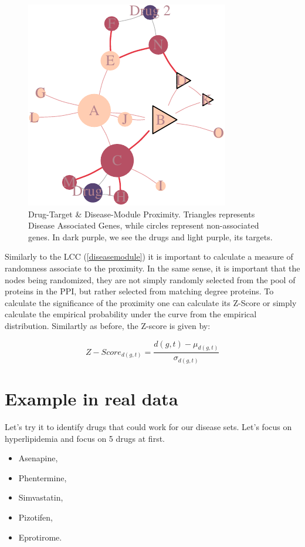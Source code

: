 \documentclass[
]{book}
\providecommand{\tightlist}{%
  \setlength{\itemsep}{0pt}\setlength{\parskip}{0pt}}
\begin{document}
\begin{figure}
\centering
\includegraphics{NetMed_files/figure-latex/proximity-1.pdf}
\caption{\label{fig:proximity}Drug-Target \& Disease-Module Proximity. Triangles represents Disease Associated Genes, while circles represent non-associated genes. In dark purple, we see the drugs and light purple, its targets.}
\end{figure}

Similarly to the LCC (\ref{diseasemodule}) it is important to calculate a measure of randomness associate to the proximity. In the same sense, it is important that the nodes being randomized, they are not simply randomly selected from the pool of proteins in the PPI, but rather selected from matching degree proteins. To calculate the significance of the proximity one can calculate its Z-Score or simply calculate the empirical probability under the curve from the empirical distribution. Similartly as before, the Z-score is given by:

\[
Z-Score_{d(g,t)} = \frac{d(g,t) - \mu_{d(g,t)}}{\sigma_{d(g,t)}}
\]

\hypertarget{example-in-real-data-2}{%
\section{Example in real data}\label{example-in-real-data-2}}

Let's try it to identify drugs that could work for our disease sets. Let's focus on hyperlipidemia and focus on 5 drugs at first.

\begin{itemize}
\tightlist
\item
  Asenapine,
\item
  Phentermine,
\item
  Simvastatin,
\item
  Pizotifen,
\item
  Eprotirome.
\end{itemize}
\end{document}
